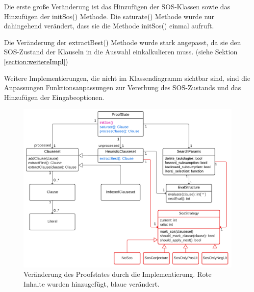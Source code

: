 Die erste große Veränderung ist das Hinzufügen der SOS-Klassen sowie das Hinzufügen der initSos() Methode. Die saturate() Methode wurde nur dahingehend verändert, dass sie die Methode initSos() einmal aufruft. 

Die Veränderung der extractBest() Methode wurde stark angepasst, da sie den SOS-Zustand der Klauseln in die Auswahl einkalkulieren muss. (siehe Sektion \ref{section:weitereImpl})

Weitere Implementierungen, die nicht im Klassendiagramm sichtbar sind, sind die Anpassungen Funktionsanpassungen zur Vererbung des SOS-Zustands und das Hinzufügen der Eingabeoptionen.

\begin{figure}
	\centering
	\includegraphics[width=1\linewidth]{images/Lucid/PyResProofStateNew}
	\caption[Veränderung des Proofstates durch die Implementierung]{Veränderung des Proofstates durch die Implementierung. Rote Inhalte wurden hinzugefügt, blaue verändert.}
	\label{fig:pyresproofstatenew}
\end{figure}
